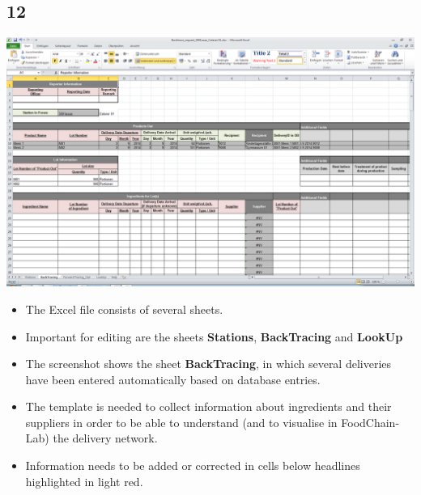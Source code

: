 \documentclass{beamer}
\begin{document}
\subsection{12}
\begin{frame}
	\begin{center}
  		\includegraphics[height=0.5\textheight]{12.png}
	\end{center}
	\begin{itemize}
		\item The Excel file consists of several sheets.
		\item Important for editing are the sheets \textbf{Stations}, \textbf{BackTracing} and \textbf{LookUp}
		\item The screenshot shows the sheet \textbf{BackTracing}, in which several deliveries have been entered automatically based on database entries.
		\item The template is needed to collect information about ingredients and their suppliers in order to be able to understand (and to visualise in FoodChain-Lab) the delivery network.
		\item Information needs to be added or corrected in cells below headlines highlighted in light red.
	\end{itemize}
\end{frame}
\end{document}
